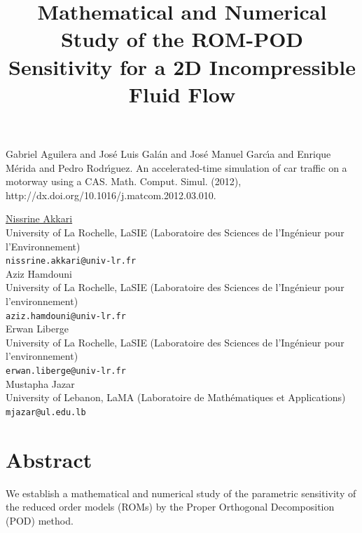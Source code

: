 \documentclass[article,A4,11pt]{llncs}%
\begin{document}

\begin{thebibliography}{10}
{\sc Gabriel Aguilera and Jos\'e Luis Gal\'an and Jos\'e Manuel Garc\'{\i}a and Enrique M\'erida and Pedro Rodr\'{\i}guez}. {An accelerated-time simulation of car traffic on a motorway using a CAS}. Math. Comput. Simul. (2012), http://dx.doi.org/10.1016/j.matcom.2012.03.010.
\end{thebibliography}

\title{Mathematical and Numerical Study of the ROM-POD Sensitivity for a 2D Incompressible Fluid Flow}
 \author{} \institute{}
\maketitle
\begin{center}
{\large \underline{Nissrine Akkari}}\\
University of La Rochelle, LaSIE (Laboratoire des Sciences de l'Ingénieur pour l'Environnement)\\
{\tt nissrine.akkari@univ-lr.fr}
\\ \vspace{4mm}
{\large Aziz Hamdouni}\\
University of La Rochelle, LaSIE (Laboratoire des Sciences de l'Ingénieur pour l'environnement)\\
{\tt aziz.hamdouni@univ-lr.fr}
\\ \vspace{4mm}
{\large Erwan Liberge}\\
University of La Rochelle, LaSIE (Laboratoire des Sciences de l'Ingénieur pour l'environnement)\\
{\tt erwan.liberge@univ-lr.fr}
\\ \vspace{4mm}
{\large Mustapha Jazar}\\
University of Lebanon, LaMA (Laboratoire de Mathématiques et Applications)\\
{\tt mjazar@ul.edu.lb}
\end{center}

\section*{Abstract}
\vspace{-0.26cm}
We establish a mathematical and numerical study of the parametric sensitivity of the reduced order models (ROMs) by the Proper Orthogonal Decomposition (POD) method.
\vspace{-0.36cm} 
\end{document}
